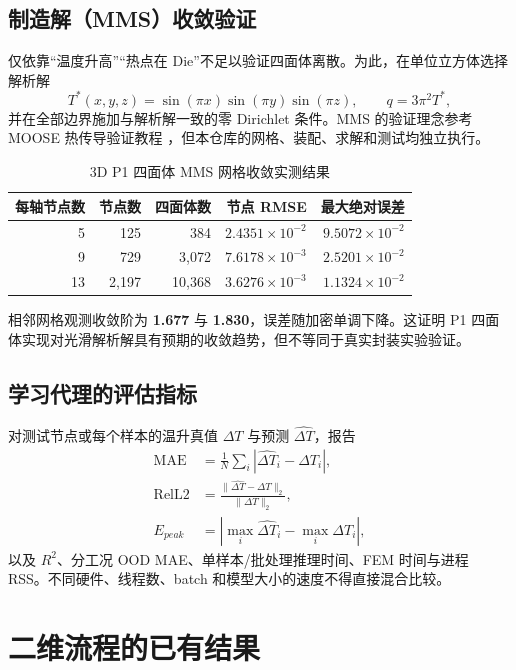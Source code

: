 \documentclass[11pt,a4paper]{article}
\newcommand{\dT}{\Delta T}
\begin{document}
\subsection{制造解（MMS）收敛验证}
仅依靠“温度升高”“热点在 Die”不足以验证四面体离散。为此，在单位立方体选择解析解
\begin{equation}
T^*(x,y,z)=\sin(\pi x)\sin(\pi y)\sin(\pi z),\qquad q=3\pi^2T^*,
\label{eq:mms}
\end{equation}
并在全部边界施加与解析解一致的零 Dirichlet 条件。MMS 的验证理念参考 MOOSE 热传导验证教程 \cite{moose}，但本仓库的网格、装配、求解和测试均独立执行。

\begin{table}[H]
\centering
\caption{3D P1 四面体 MMS 网格收敛实测结果}
\label{tab:mms}
\begin{tabular}{rrrrr}
\toprule
每轴节点数 & 节点数 & 四面体数 & 节点 RMSE & 最大绝对误差 \\
\midrule
5 & 125 & 384 & $2.4351\times10^{-2}$ & $9.5072\times10^{-2}$ \\
9 & 729 & 3,072 & $7.6178\times10^{-3}$ & $2.5201\times10^{-2}$ \\
13 & 2,197 & 10,368 & $3.6276\times10^{-3}$ & $1.1324\times10^{-2}$ \\
\bottomrule
\end{tabular}
\end{table}

相邻网格观测收敛阶为 \textbf{1.677} 与 \textbf{1.830}，误差随加密单调下降。这证明 P1 四面体实现对光滑解析解具有预期的收敛趋势，但不等同于真实封装实验验证。

\subsection{学习代理的评估指标}
对测试节点或每个样本的温升真值 $\dT$ 与预测 $\widehat{\dT}$，报告
\begin{align}
\mathrm{MAE}&=\frac{1}{N}\sum_i|\widehat{\dT}_i-\dT_i|,\\
\mathrm{RelL2}&=\frac{\|\widehat{\dT}-\dT\|_2}{\|\dT\|_2},\\
E_{peak}&=|\max_i\widehat{\dT}_i-\max_i\dT_i|,
\end{align}
以及 $R^2$、分工况 OOD MAE、单样本/批处理推理时间、FEM 时间与进程 RSS。不同硬件、线程数、batch 和模型大小的速度不得直接混合比较。

\section{二维流程的已有结果}
\end{document}
